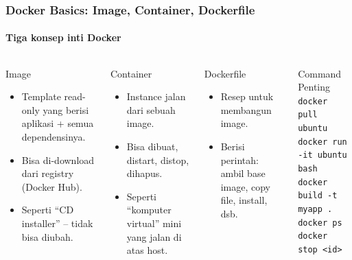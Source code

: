 \documentclass[t,aspectratio=169,xcolor=dvipsnames]{beamer}
\begin{document}
\begin{frame}[fragile, shrink=10]
    \frametitle{Docker Basics: Image, Container, Dockerfile}
    \framesubtitle{Tiga konsep inti Docker}

    \begin{columns}[T]
        \begin{block}{Image}
            \small
            \begin{itemize}
                \item Template read-only yang berisi aplikasi + semua dependensinya.
                \item Bisa di-download dari registry (Docker Hub).
                \item Seperti ``CD installer'' -- tidak bisa diubah.
            \end{itemize}
        \end{block}

        \vspace{0.1cm}
        \begin{block}{Container}
            \small
            \begin{itemize}
                \item Instance jalan dari sebuah image.
                \item Bisa dibuat, distart, distop, dihapus.
                \item Seperti ``komputer virtual'' mini yang jalan di atas host.
            \end{itemize}
        \end{block}

        \begin{block}{Dockerfile}
            \small
            \begin{itemize}
                \item Resep untuk membangun image.
                \item Berisi perintah: ambil base image, copy file, install, dsb.
            \end{itemize}
        \end{block}

        \vspace{0.05cm}
        \begin{exampleblock}{Command Penting}
            \small
            \texttt{docker pull ubuntu} \\
            \texttt{docker run -it ubuntu bash} \\
            \texttt{docker build -t myapp .} \\
            \texttt{docker ps} \\
            \texttt{docker stop <id>}
        \end{exampleblock}
    \end{columns}
\end{frame}
\end{document}
